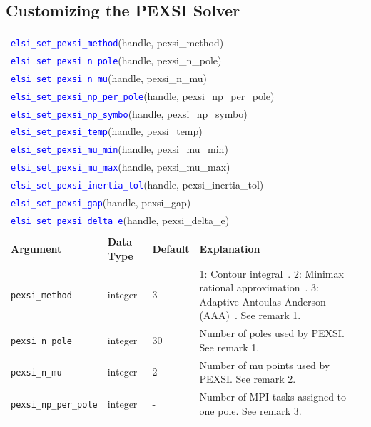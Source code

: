 \documentclass{report}
\newcommand{\api}[1]{\textcolor{blue}{\texttt{#1}}}
\begin{document}
\subsection{Customizing the PEXSI Solver}
\label{subsec:setter_pexsi}
\begin{tabular}[]{|p{30mm}|p{20mm}|p{15mm}|p{97mm}|}
\multicolumn{4}{l}{\api{elsi\_set\_pexsi\_method}(handle, pexsi\_method)}\\
\multicolumn{4}{l}{\api{elsi\_set\_pexsi\_n\_pole}(handle, pexsi\_n\_pole)}\\
\multicolumn{4}{l}{\api{elsi\_set\_pexsi\_n\_mu}(handle, pexsi\_n\_mu)}\\
\multicolumn{4}{l}{\api{elsi\_set\_pexsi\_np\_per\_pole}(handle, pexsi\_np\_per\_pole)}\\
\multicolumn{4}{l}{\api{elsi\_set\_pexsi\_np\_symbo}(handle, pexsi\_np\_symbo)}\\
\multicolumn{4}{l}{\api{elsi\_set\_pexsi\_temp}(handle, pexsi\_temp)}\\
\multicolumn{4}{l}{\api{elsi\_set\_pexsi\_mu\_min}(handle, pexsi\_mu\_min)}\\
\multicolumn{4}{l}{\api{elsi\_set\_pexsi\_mu\_max}(handle, pexsi\_mu\_max)}\\
\multicolumn{4}{l}{\api{elsi\_set\_pexsi\_inertia\_tol}(handle, pexsi\_inertia\_tol)}\\
\multicolumn{4}{l}{\api{elsi\_set\_pexsi\_gap}(handle, pexsi\_gap)}\\
\multicolumn{4}{l}{\api{elsi\_set\_pexsi\_delta\_e}(handle, pexsi\_delta\_e)}\\
\multicolumn{4}{l}{}\\
\hline
\multicolumn{1}{|l|}{\textbf{Argument}} & \multicolumn{1}{l|}{\textbf{Data Type}} & \multicolumn{1}{l|}{\textbf{Default}} & \multicolumn{1}{l|}{\textbf{Explanation}}\\
\hline
\texttt{pexsi\_method}        & integer     & 3     & 1: Contour integral~\cite{pexsi_lin_2013}. 2: Minimax rational approximation~\cite{pole_moussa_2016}. 3: Adaptive Antoulas-Anderson (AAA)~\cite{aaa_nakatsukasa_2018}. See remark 1.\\
\hline
\texttt{pexsi\_n\_pole}       & integer     & 30    & Number of poles used by PEXSI. See remark 1.\\
\hline
\texttt{pexsi\_n\_mu}         & integer     & 2     & Number of mu points used by PEXSI. See remark 2.\\
\hline
\texttt{pexsi\_np\_per\_pole} & integer     & -     & Number of MPI tasks assigned to one pole. See remark 3.\\

\end{tabular}
\end{document}
